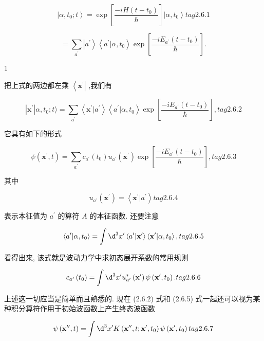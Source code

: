 \documentclass[lang=cn,newtx,10pt,scheme=chinese,thmcnt=section]{elegantbook}
\begin{document}
$$
\left| {\alpha ,{t}_{0};t}\right\rangle = \exp \left\lbrack \frac{-{iH}\left( {t - {t}_{0}}\right) }{\hbar }\right\rbrack \left| {\alpha ,{t}_{0}}\right\rangle tag{2.6.1}
$$

$$
= \mathop{\sum }\limits_{{a}^{\prime }}\left| {a}^{\prime }\right\rangle \left\langle {{a}^{\prime } | \alpha ,{t}_{0}}\right\rangle \exp \left\lbrack \frac{-i{E}_{{a}^{\prime }}\left( {t - {t}_{0}}\right) }{\hbar }\right\rbrack .
$$

1

把上式的两边都左乘 $\left\langle {\mathbf{x}}^{\prime }\right|$ ,我们有

$$
\left| {\mathbf{x}}^{\prime }\right| \alpha ,{t}_{0};t\rangle = \mathop{\sum }\limits_{{a}^{\prime }}\left\langle {{\mathbf{x}}^{\prime } | {a}^{\prime }}\right\rangle \left\langle {{a}^{\prime } | \alpha ,{t}_{0}}\right\rangle \exp \left\lbrack \frac{-i{E}_{{a}^{\prime }}\left( {t - {t}_{0}}\right) }{\hbar }\right\rbrack , tag{2.6.2}
$$

它具有如下的形式

$$
\psi \left( {{\mathbf{x}}^{\prime }, t}\right) = \mathop{\sum }\limits_{{a}^{\prime }}{c}_{{a}^{\prime }}\left( {t}_{0}\right) {u}_{{a}^{\prime }}\left( {\mathbf{x}}^{\prime }\right) \exp \left\lbrack \frac{-i{E}_{{a}^{\prime }}\left( {t - {t}_{0}}\right) }{\hbar }\right\rbrack , tag{2.6.3}
$$

其中

$$
{u}_{{a}^{\prime }}\left( {\mathbf{x}}^{\prime }\right) = \left\langle {{\mathbf{x}}^{\prime } | {a}^{\prime }}\right\rangle tag{2.6.4}
$$

表示本征值为 ${a}^{\prime }$ 的算符 $A$ 的本征函数. 还要注意

$$
\left\langle {{a}^{\prime } | \alpha ,{t}_{0}}\right\rangle = \int {\d}^{3}{x}^{\prime }\left\langle {{a}^{\prime } | {\mathbf{x}}^{\prime }}\right\rangle \left\langle {{\mathbf{x}}^{\prime } | \alpha ,{t}_{0}}\right\rangle , tag{2.6.5}
$$

看得出来, 该式就是波动力学中求初态展开系数的常用规则

$$
{c}_{{a}^{\prime }}\left( {t}_{0}\right) = \int {\d}^{3}{x}^{\prime }{u}_{{a}^{\prime }}^{ * }\left( {\mathbf{x}}^{\prime }\right) \psi \left( {{\mathbf{x}}^{\prime },{t}_{0}}\right) . tag{2.6.6}
$$

上述这一切应当是简单而且熟悉的. 现在 (2.6.2) 式和 (2.6.5) 式一起还可以视为某种积分算符作用于初始波函数上产生终态波函数

$$
\psi \left( {{\mathbf{x}}^{\prime \prime }, t}\right) = \int {\d}^{3}{x}^{\prime }K\left( {{\mathbf{x}}^{\prime \prime }, t;{\mathbf{x}}^{\prime },{t}_{0}}\right) \psi \left( {{\mathbf{x}}^{\prime },{t}_{0}}\right) tag{2.6.7}
$$
\end{document}
